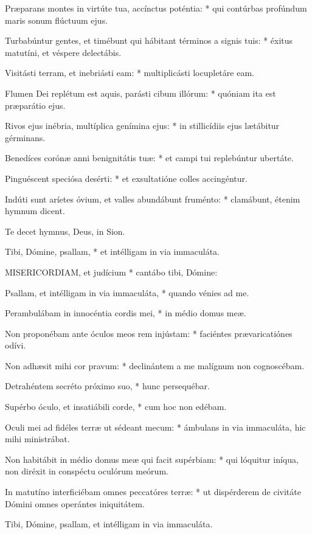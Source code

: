 Præparans montes in virtúte tua, accínctus poténtia: * qui contúrbas profúndum maris sonum flúctuum ejus.

Turbabúntur gentes, et timébunt qui hábitant términos a signis tuis: * éxitus matutíni, et véspere delectábis.

Visitásti terram, et inebriásti eam: * multiplicásti locupletáre eam.

Flumen Dei replétum est aquis, parásti cibum illórum: * quóniam ita est præparátio ejus.

Rivos ejus inébria, multíplica genímina ejus: * in stillicídiis ejus lætábitur gérminans.

Benedíces corónæ anni benignitátis tuæ: * et campi tui replebúntur ubertáte.

Pinguéscent speciósa desérti: * et exsultatióne colles accingéntur.

Indúti sunt aríetes óvium, et valles abundábunt fruménto: * clamábunt, étenim hymnum dicent.

 Te decet hymnus, Deus, in Sion.

 Tibi, Dómine, psallam, * et intélligam in via immaculáta.


\lettrine[lines=2]{M}{ISERICORDIAM}, et judícium * cantábo tibi, Dómine:

Psallam, et intélligam in via immaculáta, * quando vénies ad me.

Perambulábam in innocéntia cordis mei, * in médio domus meæ.

Non proponébam ante óculos meos rem injústam: * faciéntes prævaricatiónes odívi.

Non adhæsit mihi cor pravum: * declinántem a me malígnum non cognoscébam.

Detrahéntem secréto próximo suo, * hunc persequébar.

Supérbo óculo, et insatiábili corde, * cum hoc non edébam.

Oculi mei ad fidéles terræ ut sédeant mecum: * ámbulans in via immaculáta, hic mihi ministrábat.

Non habitábit in médio domus meæ qui facit supérbiam: * qui lóquitur iníqua, non diréxit in conspéctu oculórum meórum.

In matutíno interficiébam omnes peccatóres terræ: * ut dispérderem de civitáte Dómini omnes operántes iniquitátem.

 Tibi, Dómine, psallam, et intélligam in via immaculáta.

